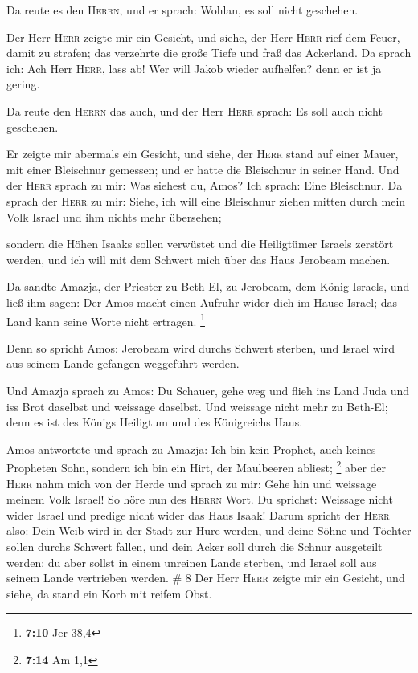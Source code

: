  Da reute es den \textsc{Herrn}, und er sprach: Wohlan, es
soll nicht geschehen.

 Der Herr \textsc{Herr} zeigte mir ein Gesicht, und siehe,
der Herr \textsc{Herr} rief dem Feuer, damit zu strafen; das verzehrte
die große Tiefe und fraß das Ackerland.  Da sprach ich:
Ach Herr \textsc{Herr}, lass ab! Wer will Jakob wieder aufhelfen? denn
er ist ja gering.

 Da reute den \textsc{Herrn} das auch, und der Herr
\textsc{Herr} sprach: Es soll auch nicht geschehen.

 Er zeigte mir abermals ein Gesicht, und siehe, der
\textsc{Herr} stand auf einer Mauer, mit einer Bleischnur gemessen; und
er hatte die Bleischnur in seiner Hand.  Und der
\textsc{Herr} sprach zu mir: Was siehest du, Amos? Ich sprach: Eine
Bleischnur. Da sprach der \textsc{Herr} zu mir: Siehe, ich will eine
Bleischnur ziehen mitten durch mein Volk Israel und ihm nichts mehr
übersehen;

 sondern die Höhen Isaaks sollen verwüstet und die
Heiligtümer Israels zerstört werden, und ich will mit dem Schwert mich
über das Haus Jerobeam machen.

 Da sandte Amazja, der Priester zu Beth-El, zu Jerobeam,
dem König Israels, und ließ ihm sagen: Der Amos macht einen Aufruhr
wider dich im Hause Israel; das Land kann seine Worte nicht ertragen.
\footnote{\textbf{7:10} Jer 38,4}

 Denn so spricht Amos: Jerobeam wird durchs Schwert
sterben, und Israel wird aus seinem Lande gefangen weggeführt werden.

 Und Amazja sprach zu Amos: Du Schauer, gehe weg und
flieh ins Land Juda und iss Brot daselbst und weissage daselbst.
 Und weissage nicht mehr zu Beth-El; denn es ist des
Königs Heiligtum und des Königreichs Haus.

 Amos antwortete und sprach zu Amazja: Ich bin kein
Prophet, auch keines Propheten Sohn, sondern ich bin ein Hirt, der
Maulbeeren abliest; \footnote{\textbf{7:14} Am 1,1}  aber
der \textsc{Herr} nahm mich von der Herde und sprach zu mir: Gehe hin
und weissage meinem Volk Israel!  So höre nun des
\textsc{Herrn} Wort. Du sprichst: Weissage nicht wider Israel und
predige nicht wider das Haus Isaak!  Darum spricht der
\textsc{Herr} also: Dein Weib wird in der Stadt zur Hure werden, und
deine Söhne und Töchter sollen durchs Schwert fallen, und dein Acker
soll durch die Schnur ausgeteilt werden; du aber sollst in einem
unreinen Lande sterben, und Israel soll aus seinem Lande vertrieben
werden. \# 8  Der Herr \textsc{Herr} zeigte mir ein
Gesicht, und siehe, da stand ein Korb mit reifem Obst.

